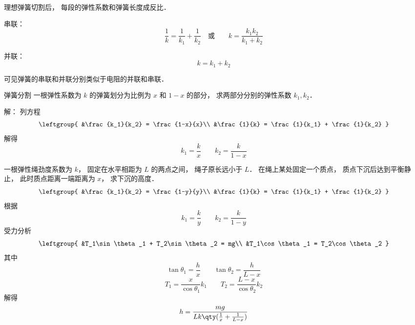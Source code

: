 
\begin{issues}
\issueDraft
\end{issues}


理想弹簧切割后， 每段的弹性系数和弹簧长度成反比．

串联：
\begin{equation}
\frac{1}{k} = \frac{1}{k_1} + \frac{1}{k_2}
\quad \text{或} \qquad
k = \frac{k_1 k_2}{k_1 + k_2}
\end{equation}

并联：
\begin{equation}
k = k_1 + k_2
\end{equation}

可见弹簧的串联和并联分别类似于电阻的并联和串联．


\begin{example}{弹簧分割}
一根弹性系数为 $k$ 的弹簧划分为比例为 $x$ 和 $1-x$ 的部分， 求两部分分别的弹性系数 $k_1, k_2$．

解： 列方程
\begin{equation}
\leftgroup{
&\frac{k_1}{k_2} = \frac{1-x}{x}\\
&\frac{1}{k} = \frac{1}{k_1} + \frac{1}{k_2}
}
\end{equation}
解得
\begin{equation}
k_1 = \frac{k}{x} \qquad k_2 = \frac{k}{1-x}
\end{equation}
\end{example}

\begin{example}{}
一根弹性绳劲度系数为 $k$， 固定在水平相距为 $L$ 的两点之间， 绳子原长远小于 $L$． 在绳上某处固定一个质点， 质点下沉后达到平衡静止， 此时质点距离一端距离为 $x$， 求下沉的高度．
\begin{equation}
\leftgroup{
&\frac{k_1}{k_2} = \frac{1-y}{y}\\
&\frac{1}{k} = \frac{1}{k_1} + \frac{1}{k_2}
}
\end{equation}
根据
\begin{equation}
k_1 = \frac{k}{y} \qquad
k_2 = \frac{k}{1-y}
\end{equation}
受力分析
\begin{equation}
\leftgroup{
&T_1\sin\theta_1 + T_2\sin\theta_2 = mg\\
&T_1\cos\theta_1 = T_2\cos\theta_2
}
\end{equation}
其中
\begin{equation}
\tan\theta_1 = \frac{h}{x}
\qquad
\tan\theta_2 = \frac{h}{L-x}
\end{equation}
\begin{equation}
T_1 = \frac{x}{\cos\theta_1} k_1 \qquad
T_2 = \frac{L-x}{\cos\theta_2} k_2
\end{equation}
解得
\begin{equation}
h = \frac{mg}{Lk\qty(\frac{1}{x} + \frac{1}{L-x})}
\end{equation}
\end{example}
